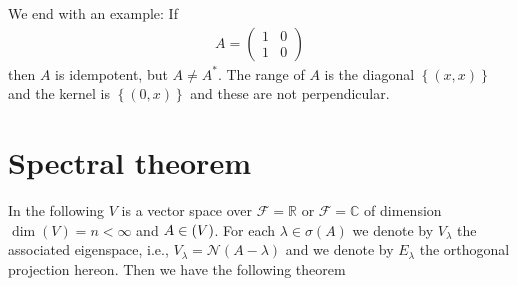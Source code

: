 \documentclass[10pt,twoside,openany,final]{memoir}
\theoremstyle{break}
\theoremstyle{Break}
\let\End\relax
\DeclareMathOperator{\End}{End}
\newcommand{\R}{\mathbb{R}}
\newcommand{\C}{\mathbb{C}}
\newcommand{\F}{\mathcal{F}}
\newcommand{\Nl}{\mathcal{N}}
\begin{document}
We end with an example: If 
\begin{align*}
A=\begin{pmatrix}
	1 & 0 \\
	1 & 0
\end{pmatrix}
\end{align*} then $A$ is idempotent, but $A \neq A^*$. The range of $A$ is the diagonal $\left\{ (x,x) \right\}$ and the kernel is $\left\{ (0,x) \right\}$ and these are not perpendicular. 
\chapter{Spectral theorem}
In the following $V$ is a vector space over $\F=\R$ or $\F=\C$ of dimension $\dim(V)=n<\infty$ and $A \in \End(V)$. For each $\lambda \in \sigma(A)$ we denote by $V_\lambda$ the associated eigenspace, i.e., $V_\lambda = \Nl(A-\lambda)$ and we denote by $E_\lambda$ the orthogonal projection hereon. Then we have the following theorem
\end{document}
